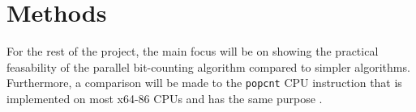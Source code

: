 
\section{Methods}
% 
For the rest of the project, the main focus will be on showing the practical feasability of the parallel bit-counting algorithm compared to simpler algorithms. Furthermore, a comparison will be made to the \texttt{popcnt} CPU instruction that is implemented on most x64-86 CPUs and has the same purpose \cite{popcnt}.

